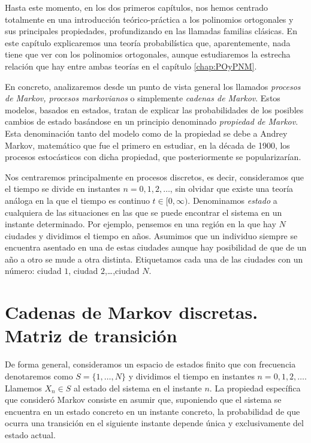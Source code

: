 %
%


Hasta este momento, en los dos primeros capítulos, nos hemos centrado totalmente en una introducción teórico-práctica a los polinomios ortogonales y sus principales propiedades, profundizando en las llamadas familias clásicas. En este capítulo explicaremos una teoría probabilística que, aparentemente, nada tiene que ver con los polinomios ortogonales, aunque estudiaremos la estrecha relación que hay entre ambas teorías en el capítulo \ref{chap:POyPNM}.

En concreto, analizaremos desde un punto de vista general los llamados \textit{procesos de Markov, procesos markovianos} o simplemente \textit{cadenas de Markov}. Estos modelos, basados en estados, tratan de explicar las probabilidades de los posibles cambios de estado basándose en un principio denominado \textit{propiedad de Markov}. Esta denominación tanto del modelo como de la propiedad se debe a Andrey Markov, matemático que fue el primero en estudiar, en la década de 1900, los procesos estocásticos con dicha propiedad, que posteriormente se popularizarían.

Nos centraremos principalmente en procesos discretos, es decir, consideramos que el tiempo se divide en instantes $n=0,1,2,\dots$, sin olvidar que existe una teoría análoga en la que el tiempo es continuo $t\in[0,\infty)$. Denominamos \textit{estado} a cualquiera de las situaciones en las que se puede encontrar el sistema en un instante determinado. Por ejemplo, pensemos en una región en la que hay $N$ ciudades y dividimos el tiempo en años. Asumimos que un individuo siempre se encuentra asentado en una de estas ciudades aunque hay posibilidad de que de un año a otro se mude a otra distinta. Etiquetamos cada una de las ciudades con un número: ciudad $1$, ciudad $2$,\dots,ciudad $N$.

\section{Cadenas de Markov discretas. Matriz de transición}

De forma general, consideramos un espacio de estados finito que con frecuencia denotaremos como $S=\{1,\dots, N\}$ y dividimos el tiempo en instantes $n=0,1,2,\dots$. Llamemos $X_n\in S$ al estado del sistema en el instante $n$. La propiedad específica que consideró Markov consiste en asumir que, suponiendo que el sistema se encuentra en un estado concreto en un instante concreto, la probabilidad de que ocurra una transición en el siguiente instante depende única y exclusivamente del estado actual.

